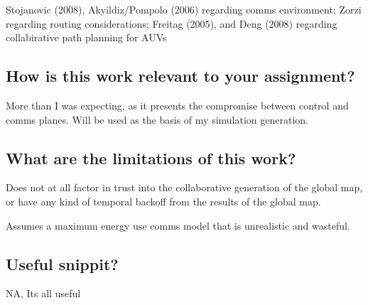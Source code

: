 \documentclass[a4paper]{report}
\begin{document}
Stojanovic (2008), Akyildiz/Pompolo (2006) regarding comms environment; Zorzi regarding routing considerations; Freitag (2005), and Deng (2008) regarding collabirative path planning for AUVs

\subsection{How is this work relevant to your assignment?}

More than I was expecting, as it presents the compromise between control and comms planes. Will be used as the basis of my simulation generation.

\subsection{What are the limitations of this work?}

Does not at all factor in trust into the collaborative generation of the global map, or have any kind of temporal backoff from the results of the global map. 

Assumes a maximum energy use comms model that is unrealistic and wasteful. 

\subsection{Useful snippit?}

NA, Its all useful
\end{document}
